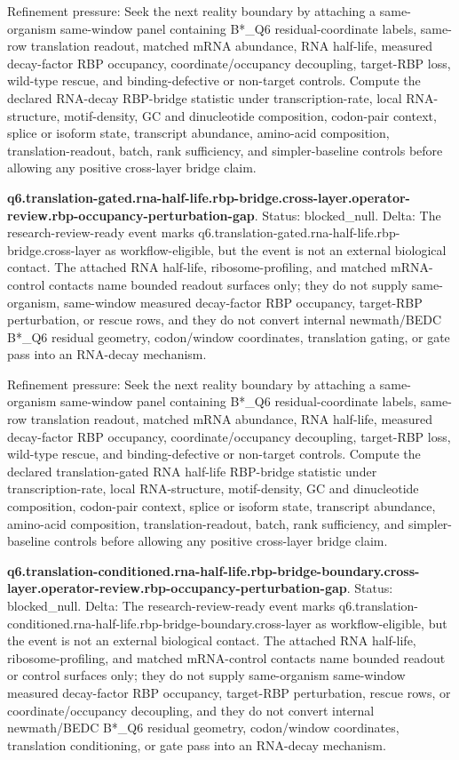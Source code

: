 Refinement pressure: Seek the next reality boundary by attaching a same-organism same-window panel containing B*\_Q6 residual-coordinate labels, same-row translation readout, matched mRNA abundance, RNA half-life, measured decay-factor RBP occupancy, coordinate/occupancy decoupling, target-RBP loss, wild-type rescue, and binding-defective or non-target controls. Compute the declared RNA-decay RBP-bridge statistic under transcription-rate, local RNA-structure, motif-density, GC and dinucleotide composition, codon-pair context, splice or isoform state, transcript abundance, amino-acid composition, translation-readout, batch, rank sufficiency, and simpler-baseline controls before allowing any positive cross-layer bridge claim.

\textbf{q6.translation-gated.rna-half-life.rbp-bridge.cross-layer.operator-review.rbp-occupancy-perturbation-gap}. Status: blocked\_null. Delta: The research-review-ready event marks q6.translation-gated.rna-half-life.rbp-bridge.cross-layer as workflow-eligible, but the event is not an external biological contact. The attached RNA half-life, ribosome-profiling, and matched mRNA-control contacts name bounded readout surfaces only; they do not supply same-organism, same-window measured decay-factor RBP occupancy, target-RBP perturbation, or rescue rows, and they do not convert internal newmath/BEDC B*\_Q6 residual geometry, codon/window coordinates, translation gating, or gate pass into an RNA-decay mechanism.

Refinement pressure: Seek the next reality boundary by attaching a same-organism same-window panel containing B*\_Q6 residual-coordinate labels, same-row translation readout, matched mRNA abundance, RNA half-life, measured decay-factor RBP occupancy, coordinate/occupancy decoupling, target-RBP loss, wild-type rescue, and binding-defective or non-target controls. Compute the declared translation-gated RNA half-life RBP-bridge statistic under transcription-rate, local RNA-structure, motif-density, GC and dinucleotide composition, codon-pair context, splice or isoform state, transcript abundance, amino-acid composition, translation-readout, batch, rank sufficiency, and simpler-baseline controls before allowing any positive cross-layer bridge claim.

\textbf{q6.translation-conditioned.rna-half-life.rbp-bridge-boundary.cross-layer.operator-review.rbp-occupancy-perturbation-gap}. Status: blocked\_null. Delta: The research-review-ready event marks q6.translation-conditioned.rna-half-life.rbp-bridge-boundary.cross-layer as workflow-eligible, but the event is not an external biological contact. The attached RNA half-life, ribosome-profiling, and matched mRNA-control contacts name bounded readout or control surfaces only; they do not supply same-organism same-window measured decay-factor RBP occupancy, target-RBP perturbation, rescue rows, or coordinate/occupancy decoupling, and they do not convert internal newmath/BEDC B*\_Q6 residual geometry, codon/window coordinates, translation conditioning, or gate pass into an RNA-decay mechanism.

